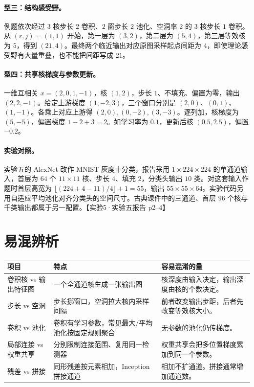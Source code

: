 \documentclass[UTF8,a4paper,zihao=-4,fontset=fandol]{ctexrep}
\begin{document}
\paragraph{型三：结构感受野。}
例题依次经过 $3$ 核步长 $2$ 卷积、$2$ 窗步长 $2$ 池化、空洞率 $2$ 的 $3$ 核步长 $1$ 卷积。从 $(r,j)=(1,1)$ 开始，第一层为 $(3,2)$，第二层为 $(5,4)$，第三层等效核为 $5$，得到 $(21,4)$。最终两个临近输出对应原图采样起点间距为 $4$，即使理论感受野有大量重叠，也不能把间距写成 $21$。

\paragraph{型四：共享核梯度与参数更新。}
一维互相关 $x=(2,0,1,-1)$，核 $(1,2)$，步长 $1$、不填充、偏置为零，输出 $(2,2,-1)$。给定上游梯度 $(1,-2,3)$，三个窗口分别是 $(2,0)$、$(0,1)$、$(1,-1)$。各乘上对应上游得 $(2,0),(0,-2),(3,-3)$。逐列加，核梯度为 $(5,-5)$，偏置梯度 $1-2+3=2$。如学习率为 $0.1$，更新后核 $(0.5,2.5)$，偏置 $-0.2$。

\paragraph{实验对照。}
实验五的 AlexNet 改作 MNIST 灰度十分类，报告采用 $1\times224\times224$ 的单通道输入，首层为 $64$ 个 $11\times11$ 核、步长 $4$、填充 $2$，分类头输出 $10$ 类。对这套输入作题时首层高宽为 $\lfloor(224+4-11)/4\rfloor+1=55$，输出 $55\times55\times64$。实验代码另用自适应平均池化对齐分类头的空间尺寸。古典课件中的三通道、首层 $96$ 个核与千类输出都属于另一配置。【实验5·实验五报告 p2--4】

\section{易混辨析}

\begin{center}
\begin{tabularx}{\linewidth}{@{}lXX@{}}
\toprule
项目 & 特点 & 容易混淆的量\\
\midrule
卷积核 vs 输出特征图 & 一个全通道核生成一张输出图 & 核深度由输入决定，输出深度由核的个数决定。\\
步长 vs 空洞 & 步长挪窗口，空洞拉大核内采样间隔 & 前者改变输出步距，后者先改变等效核大小。\\
卷积 vs 池化 & 卷积有学习参数，常见最大/平均池化按固定规则聚合 & 无参数的池化仍传梯度。\\
局部连接 vs 权重共享 & 分别限制连接范围、复用同一检测器 & 权重共享会把多位置梯度累加到同一个参数。\\
残差 vs 拼接 & 同形残差按元素相加，Inception 拼接通道 & 相加不扩通道。拼接通常增加通道数。\\
\bottomrule
\end{tabularx}
\end{center}
\end{document}
